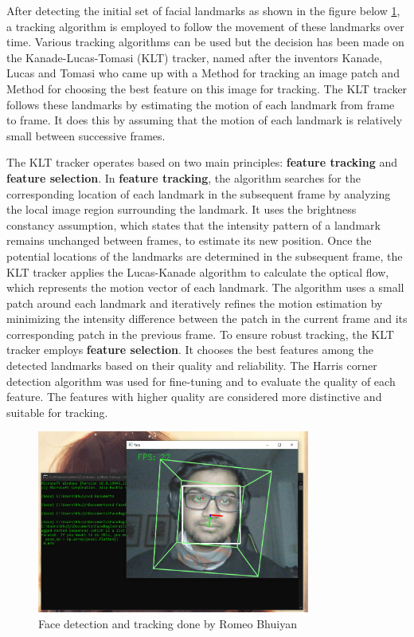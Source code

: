 After detecting the initial set of facial landmarks as shown in the figure below \ref{fig:facetracking}, 
a tracking algorithm is employed to follow the movement of these landmarks over time.
Various tracking algorithms can be used but the decision has been made on the Kanade-Lucas-Tomasi (KLT) tracker, named after
the inventors Kanade, Lucas and Tomasi who came up with a Method for tracking an image patch and Method for choosing the
best feature on this image for tracking. The KLT tracker follows these landmarks by estimating the motion of each 
landmark from frame to frame. It does this by assuming that the motion of each landmark is relatively small between 
successive frames.

The KLT tracker operates based on two main principles: \textbf{feature tracking} and \textbf{feature selection}. 
In \textbf{feature tracking}, the algorithm searches for the corresponding location of each landmark in the 
subsequent frame by analyzing the local image region surrounding the landmark. It uses the brightness 
constancy assumption, which states that the intensity pattern of a landmark remains unchanged between frames, 
to estimate its new position.
Once the potential locations of the landmarks are determined in the subsequent frame, the KLT tracker applies 
the Lucas-Kanade algorithm to calculate the optical flow, which represents the motion vector of each landmark. 
The algorithm uses a small patch around each landmark and iteratively refines the motion estimation by minimizing 
the intensity difference between the patch in the current frame and its corresponding patch in the previous frame.
To ensure robust tracking, the KLT tracker employs \textbf{feature selection}. 
It chooses the best features among the detected landmarks based on their quality and reliability. 
The Harris corner detection algorithm was used for fine-tuning and to evaluate the quality of each feature. 
The features with higher quality are considered more distinctive and suitable for tracking.

\begin{figure}[htb]
    \centering
    \includegraphics[width=0.8\textwidth]{pics/bhuiyanfracetracking.png}
    \caption{Face detection and tracking done by Romeo Bhuiyan}
    \label{fig:facetracking}
\end{figure}

